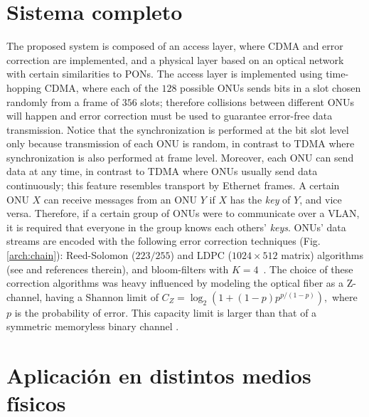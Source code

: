 \section{Sistema completo}
The proposed system is composed of an access layer, where CDMA and error correction are implemented, and a physical layer based on an optical network with certain similarities to PONs. 
The access layer is implemented using time-hopping CDMA, where each of the $128$ possible ONUs sends bits in a slot chosen randomly from a frame of $356$ slots; therefore
collisions between different ONUs will happen and error correction must be used to guarantee error-free data transmission. 
Notice that the synchronization is performed at the bit slot level only because transmission of each ONU is random, in contrast to TDMA where synchronization is also performed at frame level. 
Moreover, each ONU can send data at any time, in contrast to TDMA where
ONUs usually send data continuously; this feature resembles transport by Ethernet frames.
A certain ONU $X$ can receive messages from an ONU $Y$ if $X$ has the
{\em key} of $Y$, and vice versa. Therefore, if a certain group of ONUs
were to communicate over a VLAN, it is required that everyone in the group
knows each others' {\em keys}.
ONUs' data streams are encoded with the following error correction techniques (Fig. \ref{arch:chain}):
 Reed-Solomon ($223/255$) and LDPC ($1024\times512$ matrix) algorithms (see \cite{Moon:05} and references therein), and bloom-filters with $K=4$~\cite{Bloom70space/timetrade-offs}.
The choice of these correction algorithms was heavy influenced by
modeling the optical fiber as a Z-channel, having a Shannon limit of $ C_{Z} = \log_2\left(1+(1-p) p^{p/(1-p)}\right),$ where $p$ is the probability of error. 
This capacity limit is larger than that of a symmetric memoryless binary channel \cite{Tallini:02}.

\section{Aplicación en distintos medios físicos}
